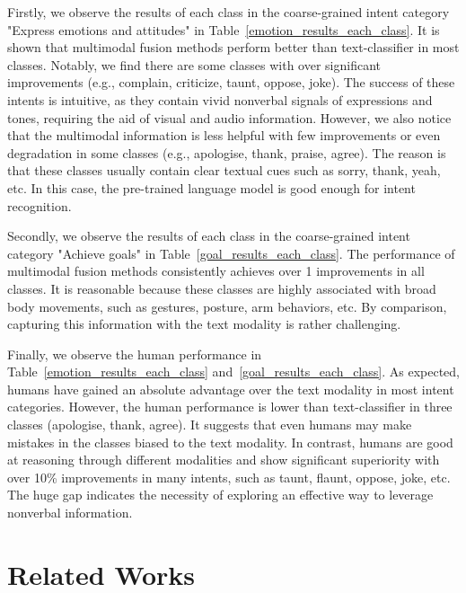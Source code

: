 \documentclass[sigconf,camera-ready]{acmart}
\begin{document}
Firstly, we observe the results of each class in the coarse-grained intent category "Express emotions and attitudes" in Table~\ref{emotion_results_each_class}. It is shown that multimodal fusion methods perform better than text-classifier in most classes. Notably, we find there are some classes with over  significant improvements (e.g., complain, criticize, taunt, oppose, joke). The success of these intents is intuitive, as they contain vivid nonverbal signals of expressions and tones, requiring the aid of visual and audio information. However, we also notice that the multimodal information is less helpful with few improvements or even degradation in some classes (e.g., apologise, thank, praise, agree). The reason is that these classes usually contain clear textual cues such as sorry, thank, yeah, etc. In this case, the pre-trained language model is good enough for intent recognition. 



Secondly, we observe the results of each class in the coarse-grained intent category "Achieve goals" in Table~\ref{goal_results_each_class}. The performance of multimodal fusion methods consistently achieves over 1 improvements in all classes. It is reasonable because these classes are highly associated with broad body movements, such as gestures, posture, arm behaviors, etc. By comparison, capturing this information with the text modality is rather challenging. 

Finally, we observe the human performance in Table~\ref{emotion_results_each_class} and~\ref{goal_results_each_class}. As expected, humans have gained an absolute advantage over the text modality in most intent categories. However, the human performance is lower than text-classifier in three classes (apologise, thank, agree). It suggests that even humans may make mistakes in the classes biased to the text modality. In contrast, humans are good at reasoning through different modalities and show significant superiority with over 10\% improvements in many intents, such as taunt, flaunt, oppose, joke, etc. The huge gap indicates the necessity of exploring an effective way to leverage nonverbal information.

\section{Related Works}
\end{document}
